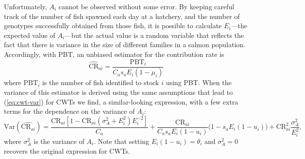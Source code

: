 \documentclass[11pt]{article}
\newcommand{\CR}{\mathrm{CR}}
\newcommand{\PBT}{\mathrm{PBT}}
\newcommand{\Var}{\mathrm{Var}}
\begin{document}
Unfortunately, $A_i$ cannot be observed without some error. By keeping careful track of the number of fish spawned 
each day at a hatchery, and the number of genotypes successfully obtained from those fish, it is possible to 
calculate $E_i$---the expected value of $A_i$---but the actual value is a random variable that reflects the fact that there 
is variance in the size of different families in a salmon population.
Accordingly, with PBT, an unbiased estimator for the contribution rate is
\begin{equation}
\widehat{\CR}_{ai} = \frac{\PBT_i }{C_a s_a E_i(1-\mu_i)}
\end{equation}
where $\PBT_i$ is the number of fish identified to stock $i$ using PBT. When the variance of this estimator is derived 
using the same assumptions that lead to (\ref{eq:cwt-var}) for CWTs
we find, a similar-looking expression, with a few extra terms for the dependence on the
variance of $A_i$:
\begin{equation}
\Var(\widehat{\CR_{ai}}) =  \frac{\CR_{ai}[1-\CR_{ai}(\sigma^2_A + E_i^2)E_i^{-2}]}{C_a} + \frac{\CR_{ai}}{C_a s_a E_i (1-u_i)}\biggl(1-s_a E_i (1-u_i)\biggr) + \CR_{ai}^2 \frac{\sigma^2_A}{E^2_i},
\end{equation}
where $\sigma^2_A$ is the variance of $A_i$.  Note that setting $E_i(1-u_i)=\theta_i$
and $\sigma^2_A=0$ recovers the original expression for CWTs.




 
\end{document}
